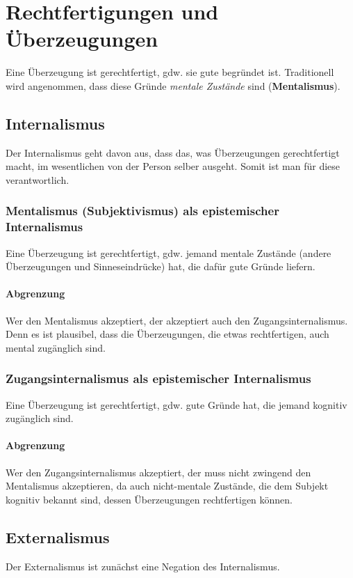 \documentclass[../main.tex]{subfiles}
\begin{document}
\section{Rechtfertigungen und Überzeugungen}
Eine Überzeugung ist gerechtfertigt, gdw. sie gute begründet ist. Traditionell wird angenommen, dass diese Gründe \textit{mentale Zustände} sind (\textbf{Mentalismus}).


\subsection{Internalismus}
Der Internalismus geht davon aus, dass das, was Überzeugungen gerechtfertigt macht, im wesentlichen von der Person selber ausgeht. Somit ist man für diese verantwortlich. 

\subsubsection{Mentalismus (Subjektivismus) als epistemischer Internalismus}
Eine Überzeugung ist gerechtfertigt, gdw. jemand mentale Zustände (andere Überzeugungen und Sinneseindrücke) hat, die dafür gute Gründe liefern.
\paragraph{Abgrenzung} Wer den Mentalismus akzeptiert, der akzeptiert auch den Zugangsinternalismus. Denn es ist plausibel, dass die Überzeugungen, die etwas rechtfertigen, auch mental zugänglich sind. 

\subsubsection{Zugangsinternalismus als epistemischer Internalismus}
Eine Überzeugung ist gerechtfertigt, gdw. gute Gründe hat, die jemand kognitiv zugänglich sind. 
\paragraph{Abgrenzung} Wer den Zugangsinternalismus akzeptiert, der muss nicht zwingend den Mentalismus akzeptieren, da auch nicht-mentale Zustände, die dem Subjekt kognitiv bekannt sind, dessen Überzeugungen rechtfertigen können. 

\subsection{Externalismus}
Der Externalismus ist zunächst eine Negation des Internalismus. 
\end{document}

